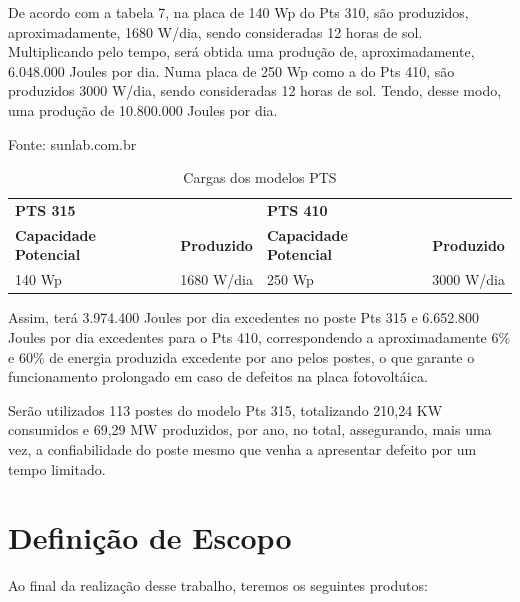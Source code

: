 	De acordo com a tabela 7, na placa de 140 Wp do Pts 310, são produzidos, aproximadamente, 1680 W/dia, sendo consideradas 12 horas de sol. Multiplicando pelo tempo, será obtida uma produção de, aproximadamente,  6.048.000 Joules por dia.
	Numa placa de 250 Wp como a do Pts 410, são produzidos 3000 W/dia, sendo consideradas 12 horas de sol. Tendo, desse modo, uma produção de 10.800.000 Joules por dia.
	
\begin{table}[h]
\center
\caption{Cargas dos modelos PTS}
\small{Fonte: sunlab.com.br}
\begin{tabular}{llll}
 &  &  &  \\ \hline
\multicolumn{2}{|l|}{\textbf{PTS 315}} & \multicolumn{2}{l|}{\textbf{PTS 410}} \\ \hline
\multicolumn{1}{|l|}{\textbf{Capacidade Potencial}} & \multicolumn{1}{l|}{\textbf{Produzido}} & \multicolumn{1}{l|}{\textbf{Capacidade Potencial}} & \multicolumn{1}{l|}{\textbf{Produzido}} \\ \hline
\multicolumn{1}{|l|}{140 Wp} & \multicolumn{1}{l|}{1680 W/dia} & \multicolumn{1}{l|}{250 Wp} & \multicolumn{1}{l|}{3000 W/dia} \\ \hline
\end{tabular}
\end{table}

	Assim, terá 3.974.400 Joules por dia excedentes no poste Pts 315 e 6.652.800 Joules por dia excedentes para o Pts 410, correspondendo a aproximadamente 6\% e 60\% de energia produzida excedente por ano pelos postes, o que garante o funcionamento prolongado em caso de defeitos na placa fotovoltáica.

	Serão utilizados 113 postes do modelo Pts 315, totalizando 210,24 KW consumidos e 69,29 MW produzidos, por ano, no total, assegurando, mais uma vez, a confiabilidade do poste mesmo que venha a apresentar defeito por um tempo limitado.

\section{Defini\c{c}\~ao de Escopo}

Ao final da realiza\c{c}\~ao desse trabalho, teremos os seguintes produtos: 

